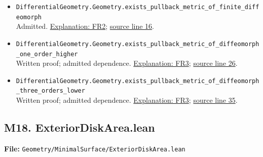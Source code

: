 \documentclass[
  letterpaper,
  11pt]{article}
\begin{document}
\begin{itemize}
\item
  {\small\texttt{Differential\allowbreak{}Geometry.\allowbreak{}Geometry.\allowbreak{}exists\_\allowbreak{}pullback\_\allowbreak{}metric\_\allowbreak{}of\_\allowbreak{}finite\_\allowbreak{}diffeomorph}}\\
  Admitted. \hyperref[fr2]{Explanation: FR2};
  \href{https://github.com/qinz1yang/differential-geometry-dev/blob/ea0fae60ee01ef8c8d9b57a51794c6538f679c5d/DifferentialGeometry/Geometry/Metric/Pullback/FiniteRegularity.lean\#L16}{source
  line 16}.
\item
  {\small\texttt{Differential\allowbreak{}Geometry.\allowbreak{}Geometry.\allowbreak{}exists\_\allowbreak{}pullback\_\allowbreak{}metric\_\allowbreak{}of\_\allowbreak{}diffeomorph\_\allowbreak{}one\_\allowbreak{}order\_\allowbreak{}higher}}\\
  Written proof; admitted dependence. \hyperref[fr3]{Explanation: FR3};
  \href{https://github.com/qinz1yang/differential-geometry-dev/blob/ea0fae60ee01ef8c8d9b57a51794c6538f679c5d/DifferentialGeometry/Geometry/Metric/Pullback/FiniteRegularity.lean\#L26}{source
  line 26}.
\item
  {\small\texttt{Differential\allowbreak{}Geometry.\allowbreak{}Geometry.\allowbreak{}exists\_\allowbreak{}pullback\_\allowbreak{}metric\_\allowbreak{}of\_\allowbreak{}diffeomorph\_\allowbreak{}three\_\allowbreak{}orders\_\allowbreak{}lower}}\\
  Written proof; admitted dependence. \hyperref[fr3]{Explanation: FR3};
  \href{https://github.com/qinz1yang/differential-geometry-dev/blob/ea0fae60ee01ef8c8d9b57a51794c6538f679c5d/DifferentialGeometry/Geometry/Metric/Pullback/FiniteRegularity.lean\#L35}{source
  line 35}.
\end{itemize}


\subsection{M18.
ExteriorDiskArea.lean}\label{m18.-exteriordiskarea.lean}

\textbf{File:}
{\small\texttt{Geometry/\allowbreak{}Minimal\allowbreak{}Surface/\allowbreak{}Exterior\allowbreak{}Disk\allowbreak{}Area.\allowbreak{}lean}}
\end{document}
